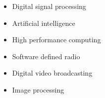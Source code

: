 \begin{itemize}
	\item Digital signal processing
	\item Artificial intelligence
	\item High performance computing
	\item Software defined radio
	\item Digital video broadcasting
	\item Image processing
	      \\
\end{itemize}

